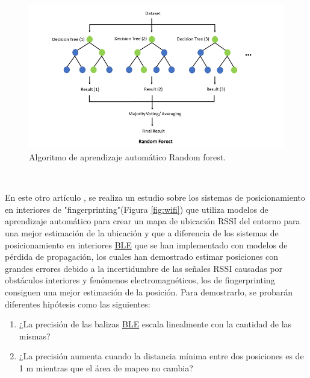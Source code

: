 \begin{figure} [H]
  \begin{center}
    \includegraphics[scale=0.8]{figs/random_forest}
  \end{center}
  \caption{Algoritmo de aprendizaje automático Random forest.}
  \label{fig:random_forest}
\end{figure}\

En este otro artículo \cite{unknown}, se realiza un estudio sobre los sistemas de posicionamiento en interiores de "fingerprinting"(Figura \ref{fig:wifi}) que utiliza modelos de aprendizaje automático para crear un mapa de ubicación RSSI del entorno para una mejor estimación de la ubicación y que a diferencia de los sistemas de posicionamiento en interiores \hyperlink{BLE}{BLE} que se han implementado con modelos de pérdida de propagación, los cuales han demostrado estimar posiciones con grandes errores debido a la incertidumbre de las señales RSSI causadas por obstáculos interiores y fenómenos electromagnéticos, los de fingerprinting consiguen una mejor estimación de la posición. Para demostrarlo, se probarán diferentes hipótesis como las siguientes:

\begin{enumerate}
 \item ¿La precisión de las balizas 
\hyperlink{BLE}{BLE} escala linealmente con la cantidad de las mismas?
 \item ¿La precisión aumenta
cuando la distancia mínima entre dos posiciones es de 1 m mientras que el área de mapeo no cambia?
\end{enumerate}\ 

